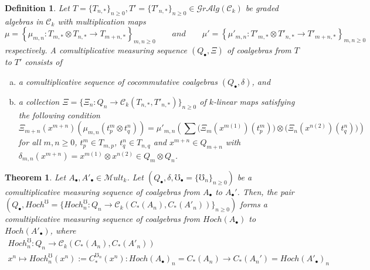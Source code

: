 \documentclass[10pt, colorlinks]{article}
\numberwithin{equation}{section} \DeclareMathSizes{2}{10}{12}{13}
\newtheorem{Thm}[thm]{Theorem}
\newtheorem{defn}[thm]{Definition}
\begin{document}
    \begin{defn}\label{def6.10}
     Let $T=\{T_{n,*}\}_{n\geq 0}, T'=\{T'_{n,*}\}_{n\geq 0}\in \mathscr Gr\mathcal Alg(\mathcal C_k)$ be graded algebras in $\mathcal C_{k}$ with multiplication maps
      \begin{equation*}
         \mu=\left\{\mu_{m,n}:T_{m,*}\otimes T_{n,*}\longrightarrow T_{m+n,*}\right\}_{m,n\geq 0}\qquad\textit{and}\qquad\mu'=\left\{\mu'_{m,n}:T'_{m,*}\otimes T'_{n,*}\longrightarrow T'_{m+n,*}\right\}_{m,n\geq 0}
     \end{equation*}respectively.  A comultiplicative measuring sequence $(Q_\bullet,\Xi)$ of coalgebras from $T$ to $T'$ consists of
     \begin{enumerate}[(a)]
         \item a comultiplicative sequence of cocommutative coalgebras $(Q_\bullet,\delta)$, and
         \item  a collection  $\Xi=\Big\{\Xi_n:Q_n\longrightarrow  \mathcal C_k(T_{n,*},T'_{n,*})\Big\}_{n\geq 0}$ of $k$-linear maps
    satisfying the following condition
     \begin{equation}\label{eq6.16}
        \Xi_{m+n}(x^{m+n})(\mu_{m,n}(t^m_p\otimes t^n_q))=\mu'_{m,n}\left(\sum\Big(\Xi_m(x^{m(1)})(t^m_p)\Big)\otimes\Big(\Xi_n(x^{n(2)})(t^n_q) \Big)\right)
     \end{equation}
     for all $m,n\geq 0$, $t_p^m\in T_{m,p}$, $t_q^n\in T_{n,q}$ and $x^{m+n}\in Q_{m+n}$ with $\delta_{m,n}(x^{m+n})=x^{m(1)}\otimes x^{n(2)}\in Q_m\otimes Q_n$.
      \end{enumerate}
\end{defn}



\begin{Thm}\label{Thm6.11}
     Let  $A_\bullet,A'_\bullet\in \mathscr{M}ult_k$. Let $(Q_\bullet,\delta, \mho_\bullet=\{\mho_n\}_{n\geq 0})$ be a comultiplicative measuring sequence of coalgebras from $A_\bullet$ to $A_\bullet'$. Then, the pair $(Q_\bullet,Hoch^{\mho}=\{Hoch_{n}^{\mho}:Q_n\longrightarrow  \mathcal C_k(C_*(A_n),C_*(A'_n))\}_{n\geq 0})$ forms a comultiplicative measuring sequence of coalgebras from $Hoch(A_\bullet)$ to $Hoch(A'_\bullet)$, where 
     \begin{equation}
     \begin{array}{c}
          Hoch_{n}^{\mho}:Q_n\longrightarrow  \mathcal C_k(C_*(A_n),C_*(A'_n))  \\
          x^n\longmapsto Hoch_{n}^{\mho}(x^n):=C^{\mho_n}_*(x^n):Hoch(A_\bullet)_n=C_*(A_n)\longrightarrow C_*(A_n')=Hoch(A'_\bullet)_n
     \end{array}
     \end{equation}
\end{Thm}
\end{document}

